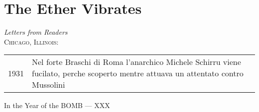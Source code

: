 \chapter{The Ether Vibrates}
\vspace{-1cm}
\emph{Letters from Readers}\\

\noindent \textsc{Chicago, Illinois:}\\

\begin{flushright} 
\begin{tabular}{l p{8cm}}
1931 & Nel forte Braschi di Roma l'anarchico Michele Schirru viene fucilato, perche scoperto mentre attuava un attentato contro Mussolini
\end{tabular}

In the Year of the BOMB --- XXX\\ \end{flushright}

